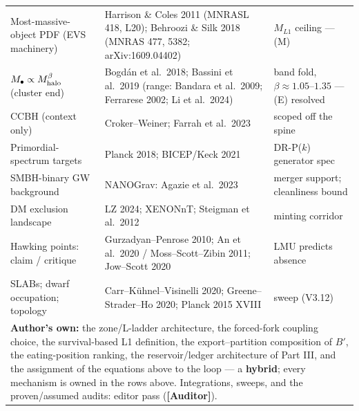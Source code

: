 \documentclass[11pt]{article}
\newcommand{\Auditor}{\textbf{\textcolor{teal!55!black}{[Auditor]}}}
\begin{document}
\begin{small}
\begin{longtable}{p{}p{}p{}}
Most-massive-object PDF (EVS machinery) & Harrison \& Coles 2011 (MNRASL 418, L20); Behroozi \& Silk 2018 (MNRAS 477, 5382; arXiv:1609.04402) & $M_{L1}$ ceiling --- (M)\\
$M_\bullet\propto M_{\rm halo}^{\beta}$ (cluster end) & Bogd\'an et al.\ 2018; Bassini et al.\ 2019 (range: Bandara et al.\ 2009; Ferrarese 2002; Li et al.\ 2024) & band fold, $\beta\approx1.05$--$1.35$ --- (E) resolved\\
CCBH (context only) & Croker--Weiner; Farrah et al.\ 2023 & scoped off the spine\\
Primordial-spectrum targets & Planck 2018; BICEP/Keck 2021 & DR-P($k$) generator spec\\
SMBH-binary GW background & NANOGrav: Agazie et al.\ 2023 & merger support; cleanliness bound\\
DM exclusion landscape & LZ 2024; XENONnT; Steigman et al.\ 2012 & minting corridor\\
Hawking points: claim / critique & Gurzadyan--Penrose 2010; An et al.\ 2020 / Moss--Scott--Zibin 2011; Jow--Scott 2020 & LMU predicts absence\\
SLABs; dwarf occupation; topology & Carr--K\"uhnel--Visinelli 2020; Greene--Strader--Ho 2020; Planck 2015 XVIII & sweep (V3.12)\\\midrule
\multicolumn{3}{p{0.95\textwidth}}{\textbf{Author's own:} the zone/L-ladder architecture, the forced-fork coupling choice, the survival-based L1 definition, the export--partition composition of $B'$, the eating-position ranking, the reservoir/ledger architecture of Part III, and the assignment of the equations above to the loop --- a \textbf{hybrid}; every mechanism is owned in the rows above. Integrations, sweeps, and the proven/assumed audits: editor pass (\Auditor).}\\\bottomrule
\end{longtable}\end{small}

\clearpage
\end{document}
